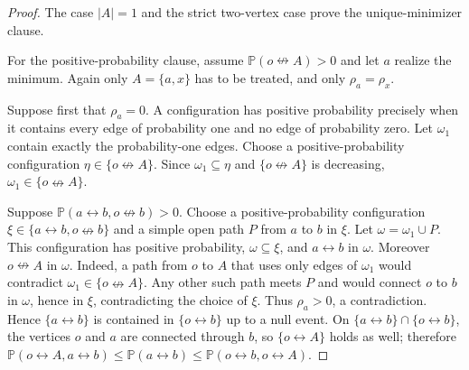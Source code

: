 \documentclass[11pt]{article}
\theoremstyle{definition}
\theoremstyle{remark}
\newcommand{\PP}{\mathbb P}
\newcommand{\con}{\leftrightarrow}
\newcommand{\ncon}{\nleftrightarrow}
\begin{document}
\begin{proof}
The case $|A|=1$ and the strict two-vertex case prove the unique-minimizer clause.

For the positive-probability clause, assume $\PP(o\ncon A)>0$ and let $a$ realize the minimum. Again
only $A=\{a,x\}$ has to be treated, and only $\rho_a=\rho_x$.

Suppose first that $\rho_a=0$. A configuration has positive probability precisely when it
contains every edge of probability one and no edge of probability zero. Let $\omega_1$
contain exactly the probability-one edges. Choose a positive-probability configuration
$\eta\in\{o\ncon A\}$. Since $\omega_1\subseteq\eta$ and $\{o\ncon A\}$ is decreasing,
$\omega_1\in\{o\ncon A\}$.

Suppose $\PP(a\con b,o\ncon b)>0$. Choose a positive-probability configuration
$\xi\in\{a\con b,o\ncon b\}$ and a simple open path $P$ from $a$ to $b$ in $\xi$. Let
$\omega=\omega_1\cup P$. This configuration has positive probability,
$\omega\subseteq\xi$, and $a\con b$ in $\omega$. Moreover $o\ncon A$ in $\omega$. Indeed,
a path from $o$ to $A$ that uses only edges of $\omega_1$ would contradict
$\omega_1\in\{o\ncon A\}$. Any other such path meets $P$ and would connect $o$ to $b$ in
$\omega$, hence in $\xi$, contradicting the choice of $\xi$. Thus $\rho_a>0$, a
contradiction. Hence $\{a\con b\}$ is contained in $\{o\con b\}$ up to a null event. On
$\{a\con b\}\cap\{o\con b\}$, the vertices $o$ and $a$ are connected through $b$, so
$\{o\con A\}$ holds as well; therefore $\PP(o\con A,a\con b)\le\PP(a\con b)\le\PP(o\con
b,o\con A)$.


\end{proof}
\end{document}
